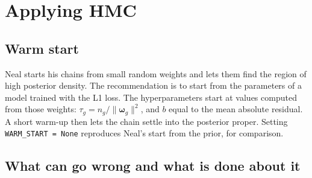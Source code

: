 \documentclass[11pt]{article}
\newcommand{\code}[1]{\texttt{#1}}
\newcommand{\bw}{\boldsymbol{\omega}}
\begin{document}
\section{Applying HMC}
\label{sec:heftnet}

\subsection{Warm start}
\label{sec:warm}

Neal starts his chains from small random weights and lets them find the region of
high posterior density. The recommendation is 
to start from the parameters of a model trained with the L1 loss. The hyperparameters start at
values computed from those weights: $\tau_g = n_g/\lVert\bw_g\rVert^2$, and $b$
equal to the mean absolute residual. A short warm-up then lets the chain settle into
the posterior proper. Setting \code{WARM\_START = None} reproduces Neal's
start from the prior, for comparison.

\subsection{What can go wrong and what is done about it}
\label{sec:cost}
\end{document}
